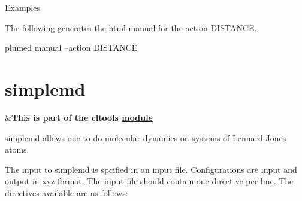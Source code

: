 \begin{DoxyParagraph}{Examples}

\end{DoxyParagraph}
The following generates the html manual for the action D\+I\+S\+T\+A\+N\+C\+E. \begin{DoxyVerb}plumed manual --action DISTANCE
\end{DoxyVerb}
 \hypertarget{simplemd}{}\section{simplemd}\label{simplemd}
\begin{TabularC}{2}
\hline
&{\bfseries  This is part of the cltools \hyperlink{mymodules}{module }}   \\
\end{TabularC}
simplemd allows one to do molecular dynamics on systems of Lennard-\/\+Jones atoms.

The input to simplemd is spcified in an input file. Configurations are input and output in xyz format. The input file should contain one directive per line. The directives available are as follows\+:

